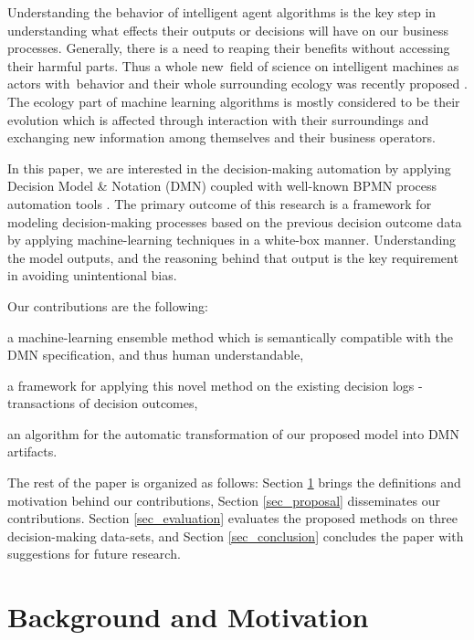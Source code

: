 \documentclass[runningheads]{llncs}
\begin{document}
Understanding the behavior of intelligent agent algorithms is the key step in understanding what effects their outputs or decisions will have on our business processes. Generally, there is a need to reaping their benefits without accessing their harmful parts. Thus a whole new~field of science on intelligent machines as actors with~behavior and their whole surrounding ecology was recently proposed \cite{Rahwan_2019}. The ecology part of machine learning algorithms is mostly considered to be their evolution which is affected through interaction with their surroundings and exchanging new information among themselves and their business operators.

In this paper, we are interested in the decision-making automation by applying Decision Model \& Notation (DMN) \cite{DMN} coupled with well-known BPMN process automation tools \cite{BPMN}. The primary outcome of this research is a framework for modeling decision-making processes based on the previous decision outcome data by applying machine-learning techniques in a white-box manner. Understanding the model outputs, and the reasoning behind that output is the key requirement in avoiding unintentional bias.

Our contributions are the following:
\begin{enumerate*}[label=(\arabic*)]
\item
  a machine-learning ensemble method which is semantically compatible with the DMN specification, and thus human understandable,
\item
  a framework for applying this novel method on the existing decision logs - transactions of decision outcomes,
\item
  an algorithm for the automatic transformation of our proposed model into DMN artifacts.
\end{enumerate*}

The rest of the paper is organized as follows: Section \ref{sec_background} brings the definitions and motivation behind our contributions, Section \ref{sec_proposal} disseminates our contributions. Section \ref{sec_evaluation} evaluates the proposed methods on three decision-making data-sets, and Section \ref{sec_conclusion} concludes the paper with suggestions for future research.

\section{Background and Motivation}
\label{sec_background}
\end{document}
